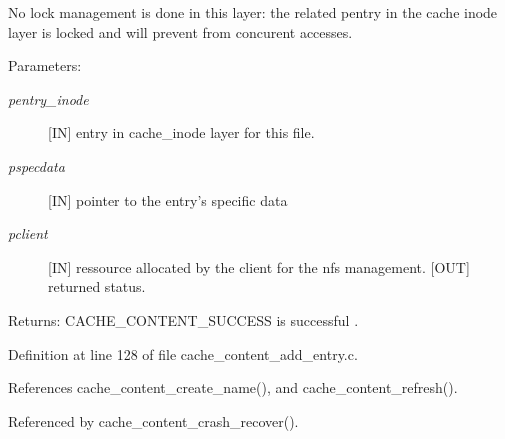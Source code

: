 No lock management is done in this layer: the related pentry in the cache inode layer is locked and will prevent from concurent accesses.

\begin{Desc}
\item[Parameters:]
\begin{description}
\item[{\em pentry\_\-inode}][IN] entry in cache\_\-inode layer for this file. \item[{\em pspecdata}][IN] pointer to the entry's specific data \item[{\em pclient}][IN] ressource allocated by the client for the nfs management.  [OUT] returned status.\end{description}
\end{Desc}
\begin{Desc}
\item[Returns:]CACHE\_\-CONTENT\_\-SUCCESS is successful . \end{Desc}


Definition at line 128 of file cache\_\-content\_\-add\_\-entry.c.

References cache\_\-content\_\-create\_\-name(), and cache\_\-content\_\-refresh().

Referenced by cache\_\-content\_\-crash\_\-recover().